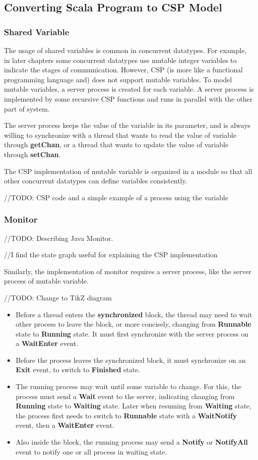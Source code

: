 \documentclass{article}
\begin{document}
\subsection{Converting Scala Program to CSP Model}
\subsubsection{Shared Variable}
The usage of shared variables is common in concurrent datatypes. For example, in later chapters some concurrent datatypes use mutable integer variables to indicate the stages of communication. However, CSP (is more like a functional programming language and) does not support mutable variables.  To model mutable variables, a server process is created for each variable. A server process is implemented by some recursive CSP functions and runs in parallel with the other part of system.

The server process keeps the value of the variable in its parameter, and is always willing to synchronize with a thread that wants to read the value of variable through \textbf{getChan}, or a thread that wants to update the value of variable through \textbf{setChan}.

The CSP implementation of mutable variable is organized in a module so that all other concurrent datatypes can define variables consistently.

//TODO: CSP code and a simple example of a process using the variable

\subsubsection{Monitor}
//TODO: Describing Java Monitor.

//I find the state graph useful for explaining the CSP implementation

Similarly, the implementation of monitor requires a server process, like the server process of mutable variable.

//TODO: Change to TikZ diagram
\begin{itemize}
    \item Before a thread enters the \textbf{synchronized} block, the thread may need to wait other process to leave the block, or more concisely, changing from \textbf{Runnable} state to \textbf{Running} state. It must first synchronize with the server process on a \textbf{WaitEnter} event.
    \item Before the process leaves the synchronized block, it must synchronize on an \textbf{Exit} event, to switch to \textbf{Finished} state.
    \item The running process may wait until some variable to change. For this, the process must send a \textbf{Wait} event to the server, indicating changing from \textbf{Running} state to \textbf{Waiting} state. Later when resuming from \textbf{Waiting} state, the process first needs to switch to \textbf{Runnable} state with a \textbf{WaitNotify} event, then a \textbf{WaitEnter} event.
    \item Also inside the block, the running process may send a \textbf{Notify} or \textbf{NotifyAll} event to notify one or all process in waiting state.
\end{itemize}
\end{document}
